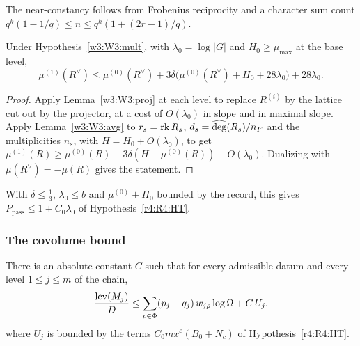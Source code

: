 The near-constancy follows from Frobenius reciprocity and a character sum count $q^k(1-1/q)\le n\le q^k(1+(2r-1)/q)$. 

\begin{proposition}[passage]\label{w3:W3:passage}
Under Hypothesis~\ref{w3:W3:mult}, with $\lambda_0=\log\lvert G\rvert$ and $H_0\ge\mu_{\max}$ at the base level,
\[
\mu^{(1)}(R^\vee)\le\mu^{(0)}(R^\vee)+3\delta\big(\mu^{(0)}(R^\vee)+H_0+28\lambda_0\big)+28\lambda_0 .
\]
\end{proposition}

\begin{proof}
Apply Lemma~\ref{w3:W3:proj} at each level to replace $R^{(i)}$ by the lattice cut out by the projector, at a cost of $O(\lambda_0)$ in slope and in maximal slope. Apply Lemma~\ref{w3:W3:avg} to $r_s=\operatorname{rk} R_s$, $d_s=\widehat{\deg}(R_s)/n_F$ and the multiplicities $n_s$, with $H=H_0+O(\lambda_0)$, to get $\mu^{(1)}(R)\ge\mu^{(0)}(R)-3\delta(H-\mu^{(0)}(R))-O(\lambda_0)$. Dualizing with $\mu(R^\vee)=-\mu(R)$ gives the statement. 
\end{proof}

With $\delta\le\frac13$, $\lambda_0\le b$ and $\mu^{(0)}+H_0$ bounded by the record, this gives $P_{\mathrm{pass}}\le1+C_0\lambda_0$ of Hypothesis~\ref{r4:R4:HT}.

\subsubsection{The covolume bound}

\begin{hypothesis}\label{w3:W3:L3}
There is an absolute constant $C$ such that for every admissible datum and every level $1\le j\le m$ of the chain,
\[
\frac{\operatorname{lcv}(M_j)}D\le\sum_{\rho\in\Phi}(p_j-q_j)\,w_{j\rho}\log\Omega+C\,U_j,
\]
where $U_j$ is bounded by the terms $C_0mx^\varepsilon(B_0+N_c)$ of Hypothesis~\ref{r4:R4:HT}.
\end{hypothesis}

